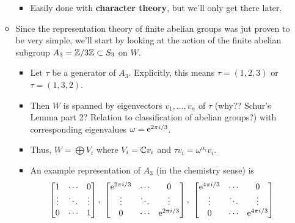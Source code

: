 \documentclass[../notes.tex]{subfiles}
\begin{document}
\begin{itemize}
\begin{itemize}
        \begin{itemize}
            \item Easily done with \textbf{character theory}, but we'll only get there later.
        \end{itemize}
        \item Since the representation theory of finite abelian groups was jut proven to be very simple, we'll start by looking at the action of the finite abelian subgroup $A_3=\Z/3\Z\subset S_3$ on $W$.
        \begin{itemize}
            \item Let $\tau$ be a generator of $A_3$. Explicitly, this means $\tau=(1,2,3)$ or $\tau=(1,3,2)$.
            \item Then $W$ is spanned by eigenvectors $v_1,\dots,v_n$ of $\tau$ (why?? Schur's Lemma part 2? Relation to classification of abelian groups?) with corresponding eigenvalues $\omega=\e[2\pi i/3]$.
            \item Thus, $W=\bigoplus V_i$ where $V_i=\C v_i$ and $\tau v_i=\omega^{\alpha_i}v_i$.
            \item An example representation of $A_3$ (in the chemistry sense) is
            \begin{equation*}
                \begin{bmatrix}
                    1 & \cdots & 0\\
                    \vdots & \ddots & \vdots\\
                    0 & \cdots & 1\\
                \end{bmatrix},\
                \begin{bmatrix}
                    \e[2\pi i/3] & \cdots & 0\\
                    \vdots & \ddots & \vdots\\
                    0 & \cdots & \e[2\pi i/3]\\
                \end{bmatrix},\
                \begin{bmatrix}
                    \e[4\pi i/3] & \cdots & 0\\
                    \vdots & \ddots & \vdots\\
                    0 & \cdots & \e[4\pi i/3]\\
                \end{bmatrix}
            \end{equation*}
        \end{itemize}

\end{itemize}
\end{itemize}
\end{document}
